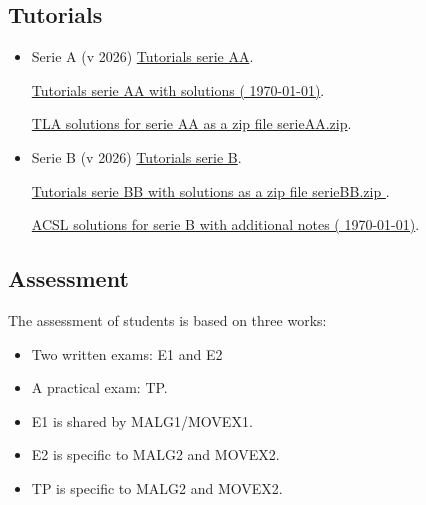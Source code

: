 \documentclass[ 12pt]{article}
\begin{document}
  

\subsection{Tutorials}



\begin{itemize}
  
  \item[]   Serie  A  (v 2026)
    \href{http://mery54.github.io/teaching/movex/lecturesnotes/movexserieAA.pdf}{Tutorials 
      serie AA}.

          \href{http://mery54.github.io/teaching/movex/lecturesnotes/correctionmovexserieAA.pdf}{Tutorials 
      serie AA with solutions ( \today)}.

    
        \href{http://mery54.github.io/teaching/movex/models/serieAA.zip}{TLA 
          solutions for serie AA  as a zip   file serieAA.zip}.


\item[]   Serie  B (v 2026)
    \href{http://mery54.github.io/teaching/movex/lecturesnotes/movexserieBB.pdf}{Tutorials 
      serie B}.

      \href{http://mery54.github.io/teaching/movex/lecturesnotes/correctionmovexserieBB.pdf}{Tutorials 
            serie BB with solutions as a zip   file serieBB.zip }. 

           \href{http://mery54.github.io/teaching/movex/models/serieBB.zip}{
             ACSL  
             solutions for serie B with additional notes ( \today)}.

  \end{itemize}




  
  
  
  \subsection{Assessment}
\label{sec:project}

The assessment  of students is based on three works:
\begin{itemize}
\item Two  written  exams: E1 and E2 
\item  A practical exam: TP.
\item E1 is shared by MALG1/MOVEX1.
\item E2 is specific to MALG2 and MOVEX2.
\item  TP   is specific to MALG2 and MOVEX2. 
 \end{itemize}
\end{document}
